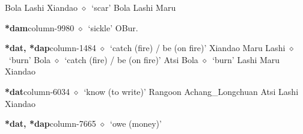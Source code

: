 \hspace{1ex}
         Bola 
\hspace{1ex}
         Lashi 
\hspace{1ex}
         Xiandao 
\hspace{1ex}
         $\diamond$~`scar'
         Bola 
\hspace{1ex}
         Lashi 
\hspace{1ex}
         Maru 
  \item {\footnotesize \textbf{*dam}}{\tiny column-9980}
         $\diamond$~`sickle'
         OBur. 
  \item {\footnotesize \textbf{*dat, *dap}}{\tiny column-1484}
         $\diamond$~`catch (fire) / be (on fire)'
         Xiandao 
\hspace{1ex}
         Maru 
\hspace{1ex}
         Lashi 
\hspace{1ex}
         $\diamond$~`burn'
         Bola 
\hspace{1ex}
         $\diamond$~`catch (fire) / be (on fire)'
         Atsi 
\hspace{1ex}
         Bola 
\hspace{1ex}
         $\diamond$~`burn'
         Lashi 
\hspace{1ex}
         Maru 
\hspace{1ex}
         Xiandao 
  \item {\footnotesize \textbf{*dat}}{\tiny column-6034}
         $\diamond$~`know (to write)'
         Rangoon 
\hspace{1ex}
         Achang\_Longchuan 
\hspace{1ex}
         Atsi 
\hspace{1ex}
         Lashi 
\hspace{1ex}
         Xiandao 
  \item {\footnotesize \textbf{*dat, *dap}}{\tiny column-7665}
         $\diamond$~`owe (money)'
